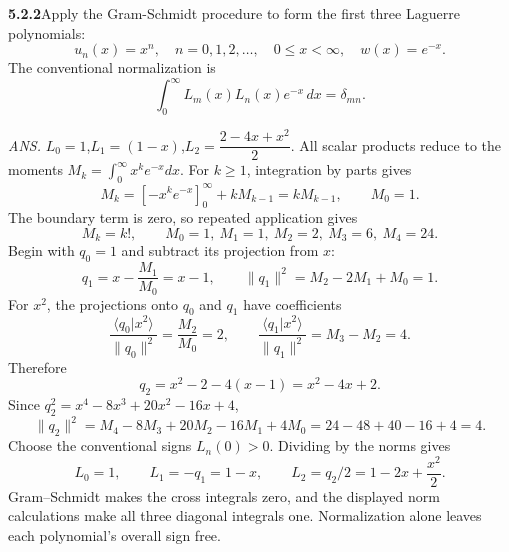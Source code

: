 \par\bigskip
\noindent\textbf{5.2.2}\quad Apply the Gram-Schmidt procedure to form the
first three Laguerre polynomials:
\[
u_{n}(x)=x^{n},\quad n=0,1,2,\ldots,\quad0\le x<\infty,\quad w(x)=e^{-x}.
\]
The conventional normalization is
\[
\int_{0}^{\infty}L_{m}(x)L_{n}(x)e^{-x}\,dx=\delta_{mn}.
\]
\par\nobreak\hfill\emph{ANS.}\enspace
$L_{0}=1$,\quad$L_{1}=(1-x)$,\quad$L_{2}=\dfrac{2-4x+x^{2}}{2}$.
\solution
All scalar products reduce to the moments
$M_k=\int_0^\infty x^ke^{-x}dx$. For $k\ge1$, integration by parts gives
\[
M_k=[-x^ke^{-x}]_0^\infty+kM_{k-1}=kM_{k-1},\qquad M_0=1.
\]
The boundary term is zero, so repeated application gives
\[
M_k=k!,\qquad
M_0=1,\ M_1=1,\ M_2=2,\ M_3=6,\ M_4=24.
\]
Begin with $q_0=1$ and subtract its projection from $x$:
\[
q_1=x-\frac{M_1}{M_0}=x-1,\qquad
\|q_1\|^2=M_2-2M_1+M_0=1.
\]
For $x^2$, the projections onto $q_0$ and $q_1$ have coefficients
\[
\frac{\langle q_0|x^2\rangle}{\|q_0\|^2}=\frac{M_2}{M_0}=2,
\qquad
\frac{\langle q_1|x^2\rangle}{\|q_1\|^2}=M_3-M_2=4.
\]
Therefore
\[
q_2=x^2-2-4(x-1)=x^2-4x+2.
\]
Since $q_2^2=x^4-8x^3+20x^2-16x+4$,
\[
\|q_2\|^2=M_4-8M_3+20M_2-16M_1+4M_0
=24-48+40-16+4=4.
\]
Choose the conventional signs $L_n(0)>0$. Dividing by the norms gives
\[
\boxed{L_0=1,\qquad L_1=-q_1=1-x,\qquad
L_2=q_2/2=1-2x+\frac{x^2}{2}}.
\]
Gram--Schmidt makes the cross integrals zero, and the displayed norm
calculations make all three diagonal integrals one. Normalization alone
leaves each polynomial's overall sign free.

